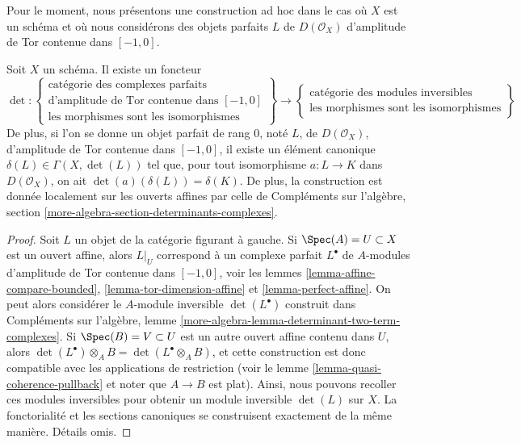 \medskip\noindent
Pour le moment, nous présentons une construction ad hoc dans le cas
où $X$ est un schéma et où nous considérons des objets parfaits $L$ de
$D(\mathcal{O}_X)$ d'amplitude de Tor contenue dans $[-1, 0]$.

\begin{lemma}
\label{lemma-determinant-two-term-complexes}
Soit $X$ un schéma. Il existe un foncteur
$$
\det :
\left\{
\begin{matrix}
\text{catégorie des complexes parfaits} \\
\text{d'amplitude de Tor contenue dans }[-1, 0] \\
\text{les morphismes sont les isomorphismes}
\end{matrix}
\right\}
\longrightarrow
\left\{
\begin{matrix}
\text{catégorie des modules inversibles} \\
\text{les morphismes sont les isomorphismes}
\end{matrix}
\right\}
$$
De plus, si l'on se donne un objet parfait de rang $0$, noté $L$, de $D(\mathcal{O}_X)$,
d'amplitude de Tor contenue dans $[-1, 0]$, il existe un élément canonique
$\delta(L) \in \Gamma(X, \det(L))$ tel que, pour tout isomorphisme
$a : L \to K$ dans $D(\mathcal{O}_X)$, on ait $\det(a)(\delta(L)) = \delta(K)$.
De plus, la construction est donnée localement sur les ouverts affines par celle
de Compléments sur l'algèbre, section \ref{more-algebra-section-determinants-complexes}.
\end{lemma}

\begin{proof}
Soit $L$ un objet de la catégorie figurant à gauche. Si $\Spec(A) = U \subset X$
est un ouvert affine, alors $L|_U$ correspond à un complexe parfait $L^\bullet$
de $A$-modules d'amplitude de Tor contenue dans $[-1, 0]$, voir les
lemmes \ref{lemma-affine-compare-bounded},
\ref{lemma-tor-dimension-affine} et
\ref{lemma-perfect-affine}.
On peut alors considérer le $A$-module inversible $\det(L^\bullet)$ construit dans
Compléments sur l'algèbre, lemme \ref{more-algebra-lemma-determinant-two-term-complexes}.
Si $\Spec(B) = V \subset U$ est un autre ouvert affine contenu dans $U$,
alors $\det(L^\bullet) \otimes_A B = \det(L^\bullet \otimes_A B)$,
et cette construction est donc compatible avec les applications de restriction
(voir le lemme \ref{lemma-quasi-coherence-pullback} et noter que $A \to B$ est plat).
Ainsi, nous pouvons recoller ces modules inversibles pour obtenir un module inversible
$\det(L)$ sur $X$. La fonctorialité et les sections canoniques
se construisent exactement de la même manière. Détails omis.
\end{proof}

